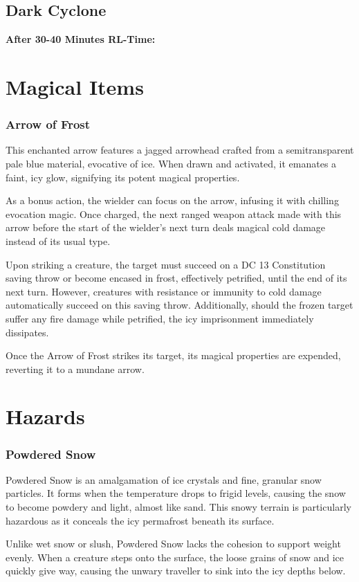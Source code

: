 \section*{Dark Cyclone}
\textbf{After 30-40 Minutes RL-Time:}

\chapter{Magical Items}
\subsection*{Arrow of Frost}
This enchanted arrow features a jagged arrowhead crafted from a semitransparent pale blue material, evocative of ice. When drawn and activated, it emanates a faint, icy glow, signifying its potent magical properties.

As a bonus action, the wielder can focus on the arrow, infusing it with chilling evocation magic. Once charged, the next ranged weapon attack made with this arrow before the start of the wielder's next turn deals magical cold damage instead of its usual type.

Upon striking a creature, the target must succeed on a DC 13 Constitution saving throw or become encased in frost, effectively petrified, until the end of its next turn. However, creatures with resistance or immunity to cold damage automatically succeed on this saving throw. Additionally, should the frozen target suffer any fire damage while petrified, the icy imprisonment immediately dissipates.

Once the Arrow of Frost strikes its target, its magical properties are expended, reverting it to a mundane arrow.


\chapter{Hazards}
\subsection*{Powdered Snow}
Powdered Snow is an amalgamation of ice crystals and fine, granular snow particles. It forms when the temperature drops to frigid levels, causing the snow to become powdery and light, almost like sand. This snowy terrain is particularly hazardous as it conceals the icy permafrost beneath its surface.

Unlike wet snow or slush, Powdered Snow lacks the cohesion to support weight evenly. When a creature steps onto the surface, the loose grains of snow and ice quickly give way, causing the unwary traveller to sink into the icy depths below.

